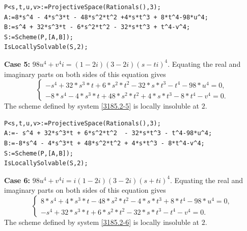 \documentclass[a4paper,12pt,english,reqno]{amsart}
\begin{document}
\begin{lstlisting}
P<s,t,u,v>:=ProjectiveSpace(Rationals(),3);
A:=8*s^4 - 4*s^3*t - 48*s^2*t^2 +4*s*t^3 + 8*t^4-98*u^4;
B:=s^4 + 32*s^3*t - 6*s^2*t^2 - 32*s*t^3 + t^4-v^4;
S:=Scheme(P,[A,B]);
IsLocallySolvable(S,2);
\end{lstlisting}

{\bf Case 5:} $98u^4+v^4i=(1-2i)(3-2i)(s-ti)^4$.  Equating the real and imaginary parts on both sides of this equation gives
\begin{equation}\label{3185.2-5}
\begin{cases}
-s^4 + 32*s^3*t + 6*s^2*t^2 - 32*s*t^3 - t^4 - 98*u^4=0,\\
-8*s^4 - 4*s^3*t + 48*s^2*t^2 + 4*s*t^3 - 8*t^4 - v^4=0.
\end{cases}
\end{equation}
The scheme defined by system \eqref{3185.2-5} is locally insoluble at $2$.


\begin{lstlisting}
P<s,t,u,v>:=ProjectiveSpace(Rationals(),3);
A:=- s^4 + 32*s^3*t + 6*s^2*t^2  - 32*s*t^3 - t^4-98*u^4;
B:=-8*s^4 - 4*s^3*t + 48*s^2*t^2 + 4*s*t^3 - 8*t^4-v^4;
S:=Scheme(P,[A,B]);
IsLocallySolvable(S,2);
\end{lstlisting}

{\bf Case 6:} $98u^4+v^4i=i(1-2i)(3-2i)(s+ti)^4$.  Equating the real and imaginary parts on both sides of this equation gives
\begin{equation}\label{3185.2-6}
\begin{cases}
8*s^4 + 4*s^3*t - 48*s^2*t^2 - 4*s*t^3 + 8*t^4 - 98*u^4=0,\\
-s^4 + 32*s^3*t + 6*s^2*t^2 - 32*s*t^3 - t^4 - v^4=0.
\end{cases}
\end{equation}
The scheme defined by system \eqref{3185.2-6} is locally insoluble at $2$.
\end{document}
